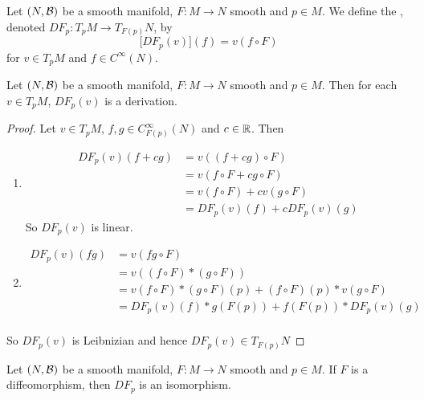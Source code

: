 \documentclass{book}
\begin{document}
	\begin{defn}
		Let $(N, \mathcal{B})$ be a smooth manifold, $F: M \rightarrow N$ smooth and $p \in M$. We define the , denoted $DF_p: T_pM \rightarrow T_{F(p)}N$, by $$\bigg[ DF_p(v) \bigg] (f) = v (f \circ F)$$  for $v \in T_pM$ and $f \in C^{\infty}(N)$.
	\end{defn}
	
	
	
	\begin{ex}
	Let $(N, \mathcal{B})$ be a smooth manifold, $F: M \rightarrow N$ smooth and $p \in M$. Then for each $v \in T_pM$, $DF_p(v)$ is a derivation.
	\end{ex}
	
	\begin{proof}
	Let $v \in T_pM$, $f,g \in C_{F(p)}^{\infty}(N)$ and $c \in \mathbb{R}$. Then 
	\begin{enumerate}
	\item 
	\begin{align*}
		DF_p(v)(f+cg) 
		&= v((f+cg) \circ F) \\
		&= v(f \circ F + c g \circ F) \\
		&= v(f \circ F) + cv(g \circ F) \\
		&= DF_p(v)(f) + c DF_p(v)(g)
	\end{align*}
	So $DF_p(v)$ is linear.
	\item 
	\begin{align*}
	DF_p(v)(fg) 
	&= v (fg \circ F) \\
	&= v((f \circ F)* (g \circ F)) \\
	&= v(f \circ F)*(g \circ F)(p) +  (f \circ F)(p)* v(g \circ F) \\
	&= DF_p(v)(f) * g(F(p)) + f(F(p))*DF_p(v)(g) \\
	\end{align*}
	\end{enumerate}
	So $DF_p(v)$ is Leibnizian and hence $DF_p(v) \in T_{F(p)}N$
	\end{proof}

	\begin{ex}
		Let $(N, \mathcal{B})$ be a smooth manifold, $F: M \rightarrow N$ smooth and $p \in M$. If $F$ is a diffeomorphism, then $DF_p$ is an isomorphism.
	\end{ex}
	
\end{document}
